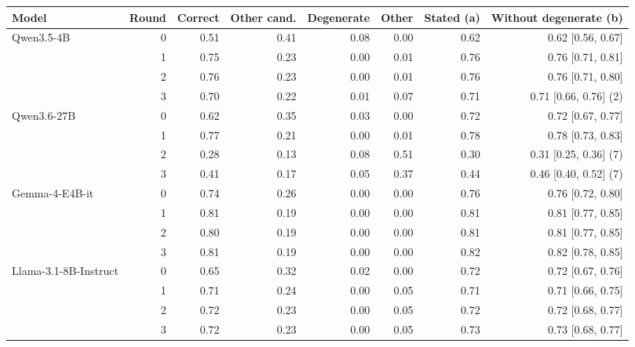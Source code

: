 \begin{tabular}{lrrrrrrr}
\toprule
Model & Round & Correct & Other cand. & Degenerate & Other & Stated (a) & Without degenerate (b) \\
\midrule
Qwen3.5-4B & 0 & 0.51 & 0.41 & 0.08 & 0.00 & 0.62 & 0.62 [0.56, 0.67] \\
 & 1 & 0.75 & 0.23 & 0.00 & 0.01 & 0.76 & 0.76 [0.71, 0.81] \\
 & 2 & 0.76 & 0.23 & 0.00 & 0.01 & 0.76 & 0.76 [0.71, 0.80] \\
 & 3 & 0.70 & 0.22 & 0.01 & 0.07 & 0.71 & 0.71 [0.66, 0.76] (2) \\
\midrule
Qwen3.6-27B & 0 & 0.62 & 0.35 & 0.03 & 0.00 & 0.72 & 0.72 [0.67, 0.77] \\
 & 1 & 0.77 & 0.21 & 0.00 & 0.01 & 0.78 & 0.78 [0.73, 0.83] \\
 & 2 & 0.28 & 0.13 & 0.08 & 0.51 & 0.30 & 0.31 [0.25, 0.36] (7) \\
 & 3 & 0.41 & 0.17 & 0.05 & 0.37 & 0.44 & 0.46 [0.40, 0.52] (7) \\
\midrule
Gemma-4-E4B-it & 0 & 0.74 & 0.26 & 0.00 & 0.00 & 0.76 & 0.76 [0.72, 0.80] \\
 & 1 & 0.81 & 0.19 & 0.00 & 0.00 & 0.81 & 0.81 [0.77, 0.85] \\
 & 2 & 0.80 & 0.19 & 0.00 & 0.00 & 0.81 & 0.81 [0.77, 0.85] \\
 & 3 & 0.81 & 0.19 & 0.00 & 0.00 & 0.82 & 0.82 [0.78, 0.85] \\
\midrule
Llama-3.1-8B-Instruct & 0 & 0.65 & 0.32 & 0.02 & 0.00 & 0.72 & 0.72 [0.67, 0.76] \\
 & 1 & 0.71 & 0.24 & 0.00 & 0.05 & 0.71 & 0.71 [0.66, 0.75] \\
 & 2 & 0.72 & 0.23 & 0.00 & 0.05 & 0.72 & 0.72 [0.68, 0.77] \\
 & 3 & 0.72 & 0.23 & 0.00 & 0.05 & 0.73 & 0.73 [0.68, 0.77] \\
\bottomrule
\end{tabular}

